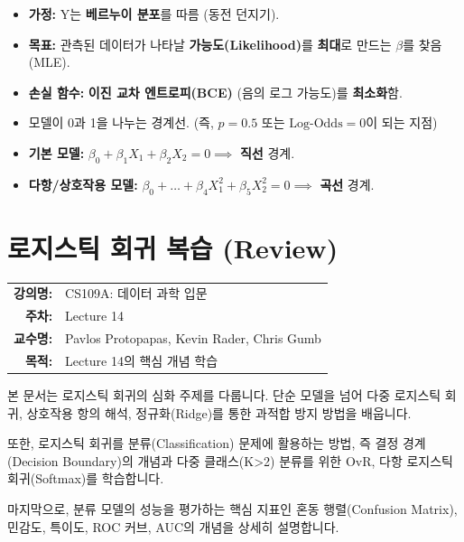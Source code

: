 \documentclass[11pt,a4paper]{book}
\makeatletter
\theoremstyle{definition}
\newcommand{\metainfo}[4]{
\begin{tcolorbox}[
    colback=lightpurple,
    colframe=darkpurple,
    boxrule=1pt,
    arc=2mm,
    left=10pt,
    right=10pt,
    top=8pt,
    bottom=8pt
]
\begin{tabular}{@{}rl@{}}
\textbf{강의명:} & #1 \\[0.3em]
\textbf{주차:} & #2 \\[0.3em]
\textbf{교수명:} & #3 \\[0.3em]
\textbf{목적:} & \begin{minipage}[t]{0.75\textwidth}#4\end{minipage}
\end{tabular}
\end{tcolorbox}
}
\makeatother
\begin{document}
\begin{tcolorbox}[colback=white, colframe=black!70, title={분류(Classification)와 로지스틱 회귀 핵심 요약}]
    \begin{tcolorbox}[colback=purple!5, colframe=purple!70, title={5. 학습 원리: MLE와 BCE}]
        \begin{itemize}
            \item \textbf{가정:} Y는 \textbf{베르누이 분포}를 따름 (동전 던지기).
            \item \textbf{목표:} 관측된 데이터가 나타날 \textbf{가능도(Likelihood)}를 \textbf{최대}로 만드는 $\beta$를 찾음 (MLE).
            \item \textbf{손실 함수:} \textbf{이진 교차 엔트로피(BCE)} (음의 로그 가능도)를 \textbf{최소화}함.
        \end{itemize}
    \end{tcolorbox}

    \begin{tcolorbox}[colback=gray!5, colframe=gray!70, title={6. 결정 경계 (Decision Boundary)}]
        \begin{itemize}
            \item 모델이 0과 1을 나누는 경계선. (즉, $p=0.5$ 또는 $\text{Log-Odds}=0$이 되는 지점)
            \item \textbf{기본 모델:} $\beta_0 + \beta_1 X_1 + \beta_2 X_2 = 0 \implies$ \textbf{직선} 경계.
            \item \textbf{다항/상호작용 모델:} $\beta_0 + \dots + \beta_4 X_1^2 + \beta_5 X_2^2 = 0 \implies$ \textbf{곡선} 경계.
        \end{itemize}
    \end{tcolorbox}
    
\end{tcolorbox}


\chapter{로지스틱 회귀 복습 (Review)}
\label{ch:lecture14}

\metainfo{CS109A: 데이터 과학 입문}{Lecture 14}{Pavlos Protopapas, Kevin Rader, Chris Gumb}{Lecture 14의 핵심 개념 학습}



\begin{summarybox}
본 문서는 로지스틱 회귀의 심화 주제를 다룹니다.
단순 모델을 넘어 다중 로지스틱 회귀, 상호작용 항의 해석, 정규화(Ridge)를 통한 과적합 방지 방법을 배웁니다.

또한, 로지스틱 회귀를 분류(Classification) 문제에 활용하는 방법,
즉 결정 경계(Decision Boundary)의 개념과 다중 클래스(K>2) 분류를 위한 OvR, 다항 로지스틱 회귀(Softmax)를 학습합니다.

마지막으로, 분류 모델의 성능을 평가하는 핵심 지표인 혼동 행렬(Confusion Matrix),
민감도, 특이도, ROC 커브, AUC의 개념을 상세히 설명합니다.
\end{summarybox}
\end{document}
